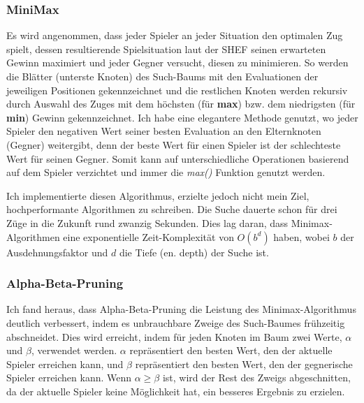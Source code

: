 \documentclass{jpp}
\begin{document}
\subsubsection{MiniMax}
Es wird angenommen, dass jeder Spieler an jeder Situation den optimalen Zug spielt, dessen resultierende Spielsituation laut der SHEF seinen erwarteten Gewinn maximiert und jeder Gegner versucht, diesen zu minimieren. So werden die Blätter (unterste Knoten) des Such-Baums mit den Evaluationen der jeweiligen Positionen gekennzeichnet und die restlichen Knoten werden rekursiv durch Auswahl des Zuges mit dem höchsten (für \textbf{max}) bzw. dem niedrigsten (für \textbf{min}) Gewinn gekennzeichnet. Ich habe eine elegantere Methode genutzt, wo jeder Spieler den negativen Wert seiner besten Evaluation an den Elternknoten (Gegner) weitergibt, denn der beste Wert für einen Spieler ist der schlechteste Wert für seinen Gegner. Somit kann auf unterschiedliche Operationen basierend auf dem Spieler verzichtet und immer die \textit{max()} Funktion genutzt werden.

Ich implementierte diesen Algorithmus, erzielte jedoch nicht mein Ziel, hochperformante Algorithmen zu schreiben. Die Suche dauerte schon für drei Züge in die Zukunft rund zwanzig Sekunden. Dies lag daran, dass Minimax-Algorithmen eine exponentielle Zeit-Komplexität von $O(b^d)$ haben, wobei $b$ der Ausdehnungsfaktor und $d$ die Tiefe (en. depth) der Suche ist.
\subsubsection{Alpha-Beta-Pruning}
Ich fand heraus, dass Alpha-Beta-Pruning die Leistung des Minimax-Algorithmus deutlich verbessert, indem es unbrauchbare Zweige des Such-Baumes frühzeitig abschneidet. Dies wird erreicht, indem für jeden Knoten im Baum zwei Werte, $\alpha$ und $\beta$, verwendet werden. $\alpha$ repräsentiert den besten Wert, den der aktuelle Spieler erreichen kann, und $\beta$ repräsentiert den besten Wert, den der gegnerische Spieler erreichen kann. Wenn $\alpha \geq \beta$ ist, wird der Rest des Zweigs abgeschnitten, da der aktuelle Spieler keine Möglichkeit hat, ein besseres Ergebnis zu erzielen.
\end{document}
